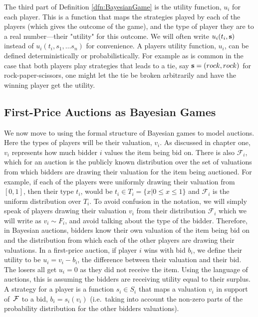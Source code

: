 \documentclass[12pt,twoside]{reedthesis}
\begin{document}
The third part of Definition \ref{dfn:BayesianGame} is the utility function, $u_i$ for each player. This is a function that maps the strategies played by each of the players (which gives the outcome of the game), and the type of player they are to a real number---their "utility" for this outcome. We will often write $u_i(t_i, \textbf{s})$ instead of $u_i(t_i, s_1, \ldots s_n)$ for convenience. A players utility function, $u_i$, can be defined deterministically or probabilistically. For example as is common in the case that both players play strategies that leads to a tie, say $\textbf{s} = (rock, rock)$ for rock-paper-scissors, one might let the tie be broken arbitrarily and have the winning player get the utility.


\subsection{First-Price Auctions as Bayesian Games}
We now move to using the formal structure of Bayesian games to model auctions. Here the types of players will be their valuation, $v_i$. As discussed in chapter one,~$v_i$ represents how much bidder $i$ values the item being bid on. There is also $\mathcal{F}_i$, which for an auction is the publicly known distribution over the set of valuations from which bidders are drawing their valuation for the item being auctioned. For example, if each of the players were uniformly drawing their valuation from $[0,1]$, then their type $t_i$, would be $t_i \in T_i = \{x | 0 \leq x \leq 1\}$ and $\mathcal{F}_i$ is the uniform distribution over $T_i$. To avoid confusion in the notation, we will simply speak of players drawing their valuation $v_i$ from their distribution $\mathcal{F}_i$ which we will write as $v_i \sim F_i$, and avoid talking about the type of the bidder. Therefore, in Bayesian auctions, bidders know their own valuation of the item being bid on and the distribution from which each of the other players are drawing their valuations. In a first-price auction, if player $i$ wins with bid $b_i$, we define their utility to be $u_i = v_i - b_i$, the difference between their valuation and their bid. The losers all get $u_i = 0$ as they did not receive the item. Using the language of auctions, this is assuming the bidders are receiving utility equal to their surplus. A strategy for a player is a function $s_i \in S_i$ that maps a valuation $v_i$ in support of~$\mathcal{F}$ to a bid, $b_i = s_i(v_i)$ (i.e.~taking into account the non-zero parts of the probability distribution for the other bidders valuations). 
\end{document}
